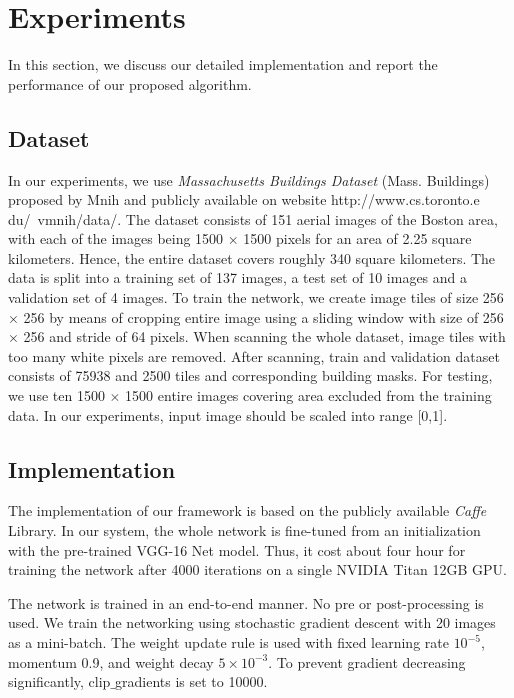 \documentclass[runningheads]{llncs}
\begin{document}
\section{Experiments}
In this section, we discuss our detailed implementation and report the performance of our proposed algorithm.

\subsection{Dataset}
In our experiments, we use \textit{Massachusetts Buildings Dataset} (Mass. Buildings) proposed by Mnih \cite{Mnih2013Machine} and publicly available on website
http://www.cs.toronto.e
du/~vmnih/data/. The dataset consists of 151 aerial images of the Boston area, with each of the images being 1500 $\times$ 1500 pixels for an area of 2.25 square
kilometers. Hence, the entire dataset covers roughly 340 square kilometers. The data is split into a training set of 137 images, a test set of 10 images and
a validation set of 4 images. To train the network, we create image tiles of size 256 $\times$ 256 by means of cropping entire image using a sliding window with size of 256 $\times$ 256 and stride of 64 pixels. When scanning the whole dataset, image tiles with too many white pixels are removed. After scanning, train and validation dataset consists of 75938 and 2500 tiles and corresponding building masks. For testing, we use ten 1500 $\times$ 1500 entire images covering area excluded from the training data. 
In our experiments, input image should be scaled into range [0,1]. 

\subsection{Implementation}
The implementation of our framework is based on the publicly  available \textit{Caffe} \cite{Jia2014Caffe} Library. In our system, the whole network is fine-tuned from an initialization with the pre-trained VGG-16 Net model. Thus, it cost about four hour for training the network after 4000 iterations on a single NVIDIA Titan 12GB GPU.

The network is trained in an end-to-end manner. No pre or post-processing is used. We train the networking using stochastic gradient descent with 20 images as a mini-batch. The weight update rule is used with fixed learning rate $10^{-5}$, momentum 0.9, and weight decay $5\times 10^{-3}$. To prevent gradient decreasing significantly, clip$\_$gradients is set to 10000. 
\end{document}
